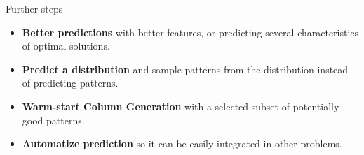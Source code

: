 \begin{frame}{Further steps}
\protect\hypertarget{further-steps}{}

\begin{itemize}[<+->]

\item
  \textbf{Better predictions} with better features, or predicting
  several characteristics of optimal solutions.
\item
  \textbf{Predict a distribution} and sample patterns from the
  distribution instead of predicting patterns.
\item
  \textbf{Warm-start Column Generation} with a selected subset of
  potentially good patterns.
\item
  \textbf{Automatize prediction} so it can be easily integrated in other
  problems.
\end{itemize}

\end{frame}
